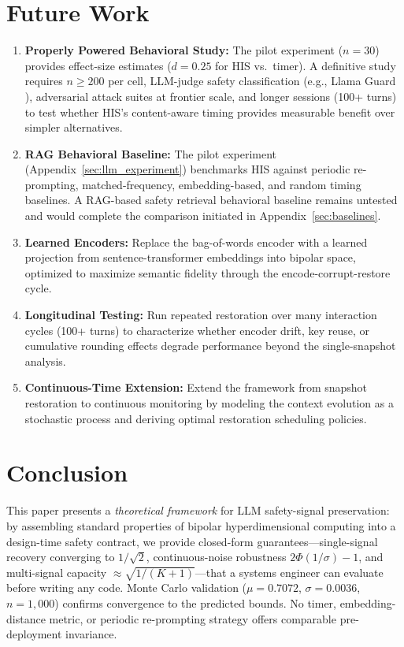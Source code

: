 \documentclass[a4paper,11pt]{article}
\begin{document}
\section{Future Work}
\label{sec:future_work}
\begin{enumerate}
    \item \textbf{Properly Powered Behavioral Study:} The pilot experiment ($n = 30$) provides effect-size estimates ($d = 0.25$ for HIS vs.\ timer). A definitive study requires $n \geq 200$ per cell, LLM-judge safety classification (e.g., Llama Guard \cite{inan2023}), adversarial attack suites at frontier scale, and longer sessions (100+ turns) to test whether HIS's content-aware timing provides measurable benefit over simpler alternatives.
    \item \textbf{RAG Behavioral Baseline:} The pilot experiment (Appendix~\ref{sec:llm_experiment}) benchmarks HIS against periodic re-prompting, matched-frequency, embedding-based, and random timing baselines. A RAG-based safety retrieval behavioral baseline remains untested and would complete the comparison initiated in Appendix~\ref{sec:baselines}.
    \item \textbf{Learned Encoders:} Replace the bag-of-words encoder with a learned projection from sentence-transformer embeddings into bipolar space, optimized to maximize semantic fidelity through the encode-corrupt-restore cycle.
    \item \textbf{Longitudinal Testing:} Run repeated restoration over many interaction cycles (100+ turns) to characterize whether encoder drift, key reuse, or cumulative rounding effects degrade performance beyond the single-snapshot analysis.
    \item \textbf{Continuous-Time Extension:} Extend the framework from snapshot restoration to continuous monitoring by modeling the context evolution as a stochastic process and deriving optimal restoration scheduling policies.
\end{enumerate}

\section{Conclusion}

This paper presents a \textit{theoretical framework} for LLM safety-signal preservation: by assembling standard properties of bipolar hyperdimensional computing \cite{kanerva2009} into a design-time safety contract, we provide closed-form guarantees---single-signal recovery converging to $1/\sqrt{2}$, continuous-noise robustness $2\Phi(1/\sigma) - 1$, and multi-signal capacity $\approx\!\sqrt{1/(K{+}1)}$---that a systems engineer can evaluate before writing any code. Monte Carlo validation ($\mu = 0.7072$, $\sigma = 0.0036$, $n = 1{,}000$) confirms convergence to the predicted bounds. No timer, embedding-distance metric, or periodic re-prompting strategy offers comparable pre-deployment invariance.
\end{document}
